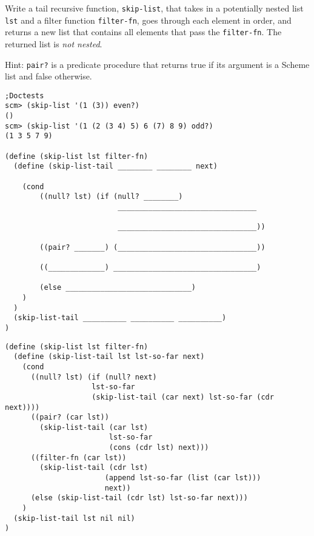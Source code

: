 \begin{blocksection}

\question Write a tail recursive function, \lstinline{skip-list}, that takes in a potentially nested list \lstinline{lst} and a filter function \lstinline{filter-fn}, goes through each element in order, and returns a new list that contains all elements that pass the \lstinline{filter-fn}. The returned list is \textit{not nested}.

Hint: \lstinline{pair?} is a predicate procedure that returns true if its argument is a Scheme list and false otherwise. 

\begin{lstlisting}
;Doctests
scm> (skip-list '(1 (3)) even?)
()
scm> (skip-list '(1 (2 (3 4) 5) 6 (7) 8 9) odd?)
(1 3 5 7 9)

(define (skip-list lst filter-fn) 
  (define (skip-list-tail ________ ________ next)

    (cond
        ((null? lst) (if (null? ________) 
                          ________________________________

                          ________________________________))

        ((pair? _______) (________________________________))

        ((_____________) _________________________________)
        
        (else _____________________________)
    )
  )
  (skip-list-tail __________ __________ __________)
)
\end{lstlisting}
\end{blocksection}

\begin{blocksection}
\begin{solution}
\begin{lstlisting}
(define (skip-list lst filter-fn) 
  (define (skip-list-tail lst lst-so-far next)
    (cond
      ((null? lst) (if (null? next) 
                    lst-so-far
                    (skip-list-tail (car next) lst-so-far (cdr next))))
      ((pair? (car lst)) 
        (skip-list-tail (car lst) 
                        lst-so-far 
                        (cons (cdr lst) next)))
      ((filter-fn (car lst)) 
        (skip-list-tail (cdr lst) 
                       (append lst-so-far (list (car lst))) 
                       next))
      (else (skip-list-tail (cdr lst) lst-so-far next)))
    )
  (skip-list-tail lst nil nil)
)

\end{lstlisting}
\end{solution}
\end{blocksection}